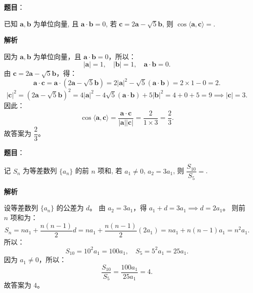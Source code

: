 \begin{answer}

\textbf{题目}：

已知 $\boldsymbol{a}, \boldsymbol{b}$ 为单位向量, 且 $\boldsymbol{a} \cdot \boldsymbol{b} = 0$, 若 $\boldsymbol{c} = 2\boldsymbol{a} - \sqrt{5}\boldsymbol{b}$, 则 $\cos\langle\boldsymbol{a}, \boldsymbol{c}\rangle =$\gkblank{}.

\textbf{解析}

因为 $\boldsymbol{a}, \boldsymbol{b}$ 为单位向量，且 $\boldsymbol{a} \cdot \boldsymbol{b} = 0$，所以：
\nopagebreak[4]
\[|\boldsymbol{a}| = 1, \quad |\boldsymbol{b}| = 1, \quad \boldsymbol{a} \cdot \boldsymbol{b} = 0.\]
由 $\boldsymbol{c} = 2\boldsymbol{a} - \sqrt{5}\boldsymbol{b}$，得：
\nopagebreak[4]
\[\boldsymbol{a} \cdot \boldsymbol{c} = \boldsymbol{a} \cdot (2\boldsymbol{a} - \sqrt{5}\boldsymbol{b}) = 2|\boldsymbol{a}|^2 - \sqrt{5}(\boldsymbol{a} \cdot \boldsymbol{b}) = 2 \times 1 - 0 = 2.\]
\nopagebreak[4]
\[|\boldsymbol{c}|^2 = (2\boldsymbol{a} - \sqrt{5}\boldsymbol{b})^2 = 4|\boldsymbol{a}|^2 - 4\sqrt{5}(\boldsymbol{a} \cdot \boldsymbol{b}) + 5|\boldsymbol{b}|^2 = 4 + 0 + 5 = 9 \implies |\boldsymbol{c}| = 3.\]
因此：
\nopagebreak[4]
\[\cos\langle\boldsymbol{a}, \boldsymbol{c}\rangle = \frac{\boldsymbol{a} \cdot \boldsymbol{c}}{|\boldsymbol{a}||\boldsymbol{c}|} = \frac{2}{1 \times 3} = \frac{2}{3}.\]
故答案为 $\dfrac{2}{3}$。


\end{answer}
\begin{answer}

\textbf{题目}：

记 $S_n$ 为等差数列 $\{a_n\}$ 的前 $n$ 项和, 若 $a_1 \neq 0$, $a_2 = 3a_1$, 则 $\dfrac{S_{10}}{S_5} =$\gkblank{}.

\textbf{解析}

设等差数列 $\{a_n\}$ 的公差为 $d$。
由 $a_2 = 3a_1$，得 $a_1 + d = 3a_1 \implies d = 2a_1$。
则前 $n$ 项和为：
\nopagebreak[4]
\[S_n = na_1 + \frac{n(n-1)}{2} d = na_1 + \frac{n(n-1)}{2}(2a_1) = na_1 + n(n-1)a_1 = n^2 a_1.\]
所以：
\nopagebreak[4]
\[S_{10} = 10^2 a_1 = 100a_1, \quad S_5 = 5^2 a_1 = 25a_1.\]
因为 $a_1 \neq 0$，所以：
\nopagebreak[4]
\[\frac{S_{10}}{S_5} = \frac{100a_1}{25a_1} = 4.\]
故答案为 $4$。


\end{answer}

